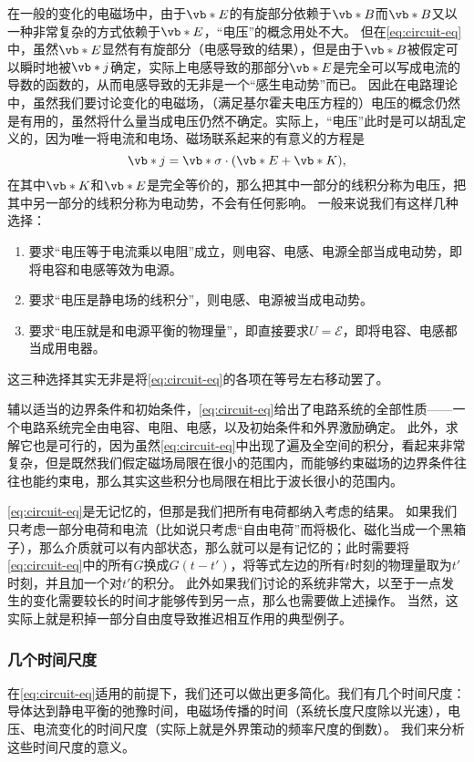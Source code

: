 在一般的变化的电磁场中，由于$\vb*{E}$的有旋部分依赖于$\vb*{B}$而$\vb*{B}$又以一种非常复杂的方式依赖于$\vb*{E}$，“电压”的概念用处不大。
但在\eqref{eq:circuit-eq}中，虽然$\vb*{E}$显然有有旋部分（电感导致的结果），但是由于$\vb*{B}$被假定可以瞬时地被$\vb*{j}$确定，实际上电感导致的那部分$\vb*{E}$是完全可以写成电流的导数的函数的，从而电感导致的无非是一个“感生电动势”而已。
因此在电路理论中，虽然我们要讨论变化的电磁场，（满足基尔霍夫电压方程的）电压的概念仍然是有用的，虽然将什么量当成电压仍然不确定。实际上，“电压”此时是可以胡乱定义的，因为唯一将电流和电场、磁场联系起来的有意义的方程是
\[
    \vb*{j} = \vb*{\sigma} \cdot (\vb*{E} + \vb*{K}),
\]
在其中$\vb*{K}$和$\vb*{E}$是完全等价的，那么把其中一部分的线积分称为电压，把其中另一部分的线积分称为电动势，不会有任何影响。
一般来说我们有这样几种选择：
\begin{enumerate}
    \item 要求“电压等于电流乘以电阻”成立，则电容、电感、电源全部当成电动势，即将电容和电感等效为电源。
    \item 要求“电压是静电场的线积分”，则电感、电源被当成电动势。
    \item 要求“电压就是和电源平衡的物理量”，即直接要求$U=\mathcal{E}$，即将电容、电感都当成用电器。
\end{enumerate}
这三种选择其实无非是将\eqref{eq:circuit-eq}的各项在等号左右移动罢了。

辅以适当的边界条件和初始条件，\eqref{eq:circuit-eq}给出了电路系统的全部性质——一个电路系统完全由电容、电阻、电感，以及初始条件和外界激励确定。
此外，求解它也是可行的，因为虽然\eqref{eq:circuit-eq}中出现了遍及全空间的积分，看起来非常复杂，但是既然我们假定磁场局限在很小的范围内，而能够约束磁场的边界条件往往也能约束电，那么其实这些积分也局限在相比于波长很小的范围内。

\eqref{eq:circuit-eq}是无记忆的，但那是我们把所有电荷都纳入考虑的结果。
如果我们只考虑一部分电荷和电流（比如说只考虑“自由电荷”而将极化、磁化当成一个黑箱子），那么介质就可以有内部状态，那么就可以是有记忆的；此时需要将\eqref{eq:circuit-eq}中的所有$G$换成$G(t-t')$，将等式左边的所有$t$时刻的物理量取为$t'$时刻，并且加一个对$t'$的积分。
此外如果我们讨论的系统非常大，以至于一点发生的变化需要较长的时间才能够传到另一点，那么也需要做上述操作。
当然，这实际上就是积掉一部分自由度导致推迟相互作用的典型例子。

\subsubsection{几个时间尺度}

在\eqref{eq:circuit-eq}适用的前提下，我们还可以做出更多简化。我们有几个时间尺度：导体达到静电平衡的弛豫时间，电磁场传播的时间（系统长度尺度除以光速），电压、电流变化的时间尺度（实际上就是外界策动的频率尺度的倒数）。
我们来分析这些时间尺度的意义。

